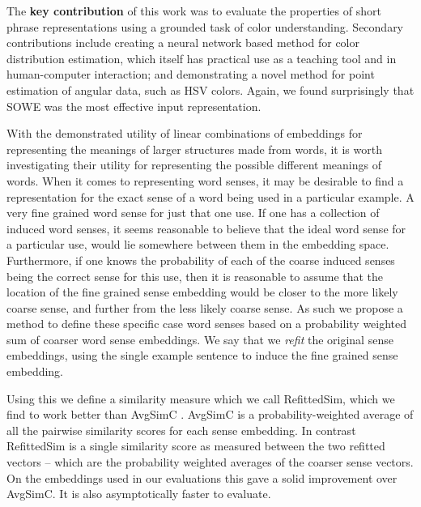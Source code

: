 \documentclass{book}
\begin{document}
The \textbf{key contribution} of this work was to evaluate the properties of short phrase representations using a grounded task of color understanding.
Secondary contributions include
creating a neural network based method for color distribution estimation, which itself has practical use as a teaching tool and in human-computer interaction;
and demonstrating a novel method for point estimation of angular data, such as HSV colors.
Again, we found surprisingly that SOWE was the most effective input representation.




With the demonstrated utility of linear combinations of embeddings for representing the meanings of larger structures made from words,
it is worth investigating their utility for representing the possible different meanings of words.
When it comes to representing word senses, it may be desirable to find a representation for the exact sense of a word being used in a particular example.
A very fine grained word sense for just that one use.
If one has a collection of induced word senses, it seems reasonable to believe that the ideal word sense for a particular use, would lie somewhere between them in the embedding space.
Furthermore, if one knows the probability of each of the coarse induced senses being the correct sense for this use,
then it is reasonable to assume that the location of the fine grained sense embedding would be closer to the more likely coarse sense,
and further from the less likely coarse sense.
As such we propose a method to define these specific case word senses based on a probability weighted sum of coarser word sense embeddings.
We say that we \emph{refit} the original sense embeddings, using the single example sentence to induce the fine grained sense embedding.

Using this we define a similarity measure which we call RefittedSim, which we find to work better than AvgSimC \citep{Reisinger2010}.
AvgSimC is a probability-weighted average of all the pairwise similarity scores for each sense embedding.
In contrast RefittedSim is a single similarity score as measured between the two refitted vectors -- which are the probability weighted averages of the coarser sense vectors.
On the embeddings used in our evaluations this gave a solid improvement over AvgSimC.
It is also asymptotically faster to evaluate.
\end{document}
